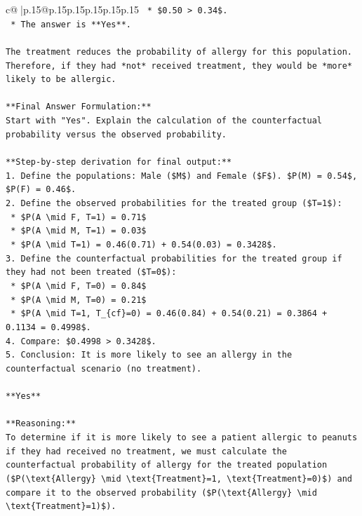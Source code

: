 \documentclass{article}
\begin{document}
{\begin{supertabular}{c@{$\;$}|p{.15\linewidth}@{}p{.15\linewidth}p{.15\linewidth}p{.15\linewidth}p{.15\linewidth}p{.15\linewidth}}
{{{\texttt{    *   \$0.50 > 0.34\$.} \\
\texttt{    *   The answer is **Yes**.} \\
\\ 
\texttt{The treatment reduces the probability of allergy for this population. Therefore, if they had *not* received treatment, they would be *more* likely to be allergic.} \\
\\ 
\texttt{**Final Answer Formulation:**} \\
\texttt{Start with "Yes". Explain the calculation of the counterfactual probability versus the observed probability.} \\
\\ 
\texttt{**Step{-}by{-}step derivation for final output:**} \\
\texttt{1.  Define the populations: Male (\$M\$) and Female (\$F\$). \$P(M) = 0.54\$, \$P(F) = 0.46\$.} \\
\texttt{2.  Define the observed probabilities for the treated group (\$T=1\$):} \\
\texttt{    *   \$P(A \textbackslash{}mid F, T=1) = 0.71\$} \\
\texttt{    *   \$P(A \textbackslash{}mid M, T=1) = 0.03\$} \\
\texttt{    *   \$P(A \textbackslash{}mid T=1) = 0.46(0.71) + 0.54(0.03) = 0.3428\$.} \\
\texttt{3.  Define the counterfactual probabilities for the treated group if they had not been treated (\$T=0\$):} \\
\texttt{    *   \$P(A \textbackslash{}mid F, T=0) = 0.84\$} \\
\texttt{    *   \$P(A \textbackslash{}mid M, T=0) = 0.21\$} \\
\texttt{    *   \$P(A \textbackslash{}mid T=1, T\_\{cf\}=0) = 0.46(0.84) + 0.54(0.21) = 0.3864 + 0.1134 = 0.4998\$.} \\
\texttt{4.  Compare: \$0.4998 > 0.3428\$.} \\
\texttt{5.  Conclusion: It is more likely to see an allergy in the counterfactual scenario (no treatment).} \\
\\ 
\texttt{**Yes**} \\
\\ 
\texttt{**Reasoning:**} \\
\texttt{To determine if it is more likely to see a patient allergic to peanuts if they had received no treatment, we must calculate the counterfactual probability of allergy for the treated population (\$P(\textbackslash{}text\{Allergy\} \textbackslash{}mid \textbackslash{}text\{Treatment\}=1, \textbackslash{}text\{Treatment\}=0)\$) and compare it to the observed probability (\$P(\textbackslash{}text\{Allergy\} \textbackslash{}mid \textbackslash{}text\{Treatment\}=1)\$).} \\
}}}
\end{supertabular}}
\end{document}

